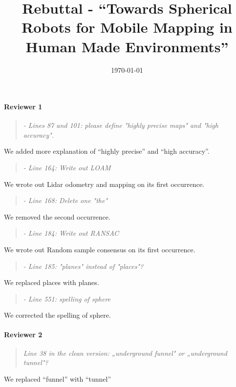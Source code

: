 \documentclass{article}
\title{Rebuttal - ``Towards Spherical Robots for Mobile Mapping in Human Made Environments''}
\date{\today}
\newenvironment{itquote}
  {\begin{quote}\itshape}
  {\end{quote}\ignorespacesafterend}
\begin{document}
\maketitle

\paragraph{Reviewer 1}

\begin{itquote}
- Lines 87 and 101: please define "highly precise maps" and "high accuracy".  
\end{itquote}
We added more explanation of ``highly precise'' and ``high accuracy''.

\begin{itquote}
- Line 164: Write out LOAM  
\end{itquote}

We wrote out Lidar odometry and mapping on its first occurrence. 

\begin{itquote}
- Line 168: Delete one "the"  
\end{itquote}

We removed the second occurrence.

\begin{itquote}
- Line 184: Write out RANSAC  
\end{itquote}

We wrote out Random sample consensus on its first occurrence. 

\begin{itquote}
- Line 185: "planes" instead of "places"?  
\end{itquote}

We replaced places with planes.

\begin{itquote}
- Line 551: spelling of sphere  
\end{itquote}

We corrected the spelling of sphere. 

\paragraph{Reviewer 2}

\begin{itquote}
  Line 38 in the clean version: „underground funnel" or „underground tunnel"?
\end{itquote}

We replaced ``funnel'' with ``tunnel''
\end{document}
